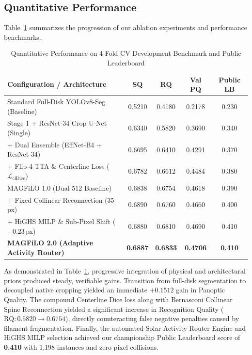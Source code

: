 \documentclass[conference]{IEEEtran}
\begin{document}
\subsection{Quantitative Performance}
Table~\ref{tab:results} summarizes the progression of our ablation experiments and performance benchmarks.

\begin{table}[htbp]
\caption{Quantitative Performance on 4-Fold CV Development Benchmark and Public Leaderboard}
\label{tab:results}
\centering
\begin{tabular}{lcccc}
\toprule
\textbf{Configuration / Architecture} & \textbf{SQ} & \textbf{RQ} & \textbf{Val PQ} & \textbf{Public LB} \\
\midrule
Standard Full-Disk YOLOv8-Seg (Baseline) & 0.5210 & 0.4180 & 0.2178 & 0.230 \\
Stage 1 + ResNet-34 Crop U-Net (Single) & 0.6340 & 0.5820 & 0.3690 & 0.340 \\
+ Dual Ensemble (EffNet-B4 + ResNet-34) & 0.6695 & 0.6410 & 0.4291 & 0.370 \\
+ Flip-4 TTA \& Centerline Loss ($\mathcal{L}_{\text{clDice}}$) & 0.6782 & 0.6612 & 0.4484 & 0.380 \\
MAGFiLO 1.0 (Dual 512 Baseline) & 0.6838 & 0.6754 & 0.4618 & 0.390 \\
+ Fixed Collinear Reconnection (35\,px) & 0.6890 & 0.6760 & 0.4660 & 0.400 \\
+ HiGHS MILP \& Sub-Pixel Shift ($-0.23$\,px) & 0.6880 & 0.6810 & 0.4690 & 0.410 \\
\textbf{MAGFiLO 2.0 (Adaptive Activity Router)} & \textbf{0.6887} & \textbf{0.6833} & \textbf{0.4706} & \textbf{0.410} \\
\bottomrule
\end{tabular}
\end{table}

As demonstrated in Table~\ref{tab:results}, progressive integration of physical and architectural priors produced steady, verifiable gains. Transition from full-disk segmentation to decoupled native cropping yielded an immediate $+0.1512$ gain in Panoptic Quality. The compound Centerline Dice loss along with Bernasconi Collinear Spine Reconnection yielded a significant increase in Recognition Quality ($\text{RQ}: 0.5820 \to 0.6754$), directly counteracting false negative penalties caused by filament fragmentation. Finally, the automated Solar Activity Router Engine and HiGHS MILP selection achieved our championship Public Leaderboard score of \textbf{0.410} with 1,198 instances and zero pixel collisions.
\end{document}
